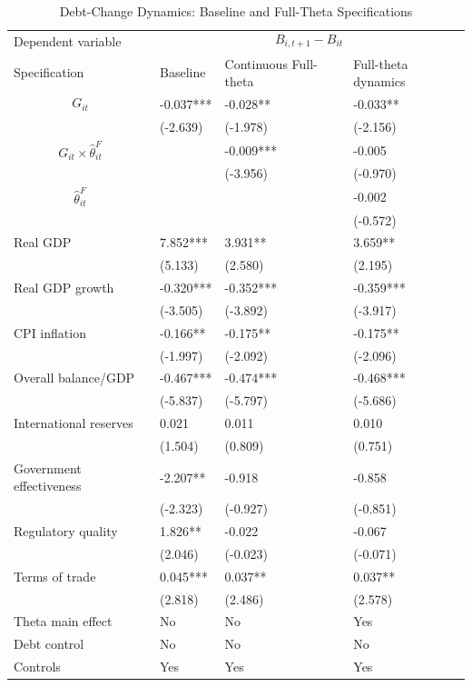 \begin{table}[H]\centering
\begin{threeparttable}
\caption{Debt-Change Dynamics: Baseline and Full-Theta Specifications}
\label{tab:debt_change_combined_fulltheta}
\scriptsize
\begin{tabularx}{\textwidth}{lYYY}
\toprule
Dependent variable &  \\
\cmidrule(lr){2-4}
Specification & Baseline & Continuous Full-theta & Full-theta dynamics \\
\midrule
$$G_{it}$$ & -0.037*** & -0.028** & -0.033** \\
 & (-2.639) & (-1.978) & (-2.156) \\
$$G_{it}\times\widehat{\theta}^{F}_{it}$$ &  & -0.009*** & -0.005 \\
 &  & (-3.956) & (-0.970) \\
$$\widehat{\theta}^{F}_{it}$$ &  &  & -0.002 \\
 &  &  & (-0.572) \\
Real GDP & 7.852*** & 3.931** & 3.659** \\
 & (5.133) & (2.580) & (2.195) \\
Real GDP growth & -0.320*** & -0.352*** & -0.359*** \\
 & (-3.505) & (-3.892) & (-3.917) \\
CPI inflation & -0.166** & -0.175** & -0.175** \\
 & (-1.997) & (-2.092) & (-2.096) \\
Overall balance/GDP & -0.467*** & -0.474*** & -0.468*** \\
 & (-5.837) & (-5.797) & (-5.686) \\
International reserves & 0.021 & 0.011 & 0.010 \\
 & (1.504) & (0.809) & (0.751) \\
Government effectiveness & -2.207** & -0.918 & -0.858 \\
 & (-2.323) & (-0.927) & (-0.851) \\
Regulatory quality & 1.826** & -0.022 & -0.067 \\
 & (2.046) & (-0.023) & (-0.071) \\
Terms of trade & 0.045*** & 0.037** & 0.037** \\
 & (2.818) & (2.486) & (2.578) \\
\midrule
Theta main effect & No & No & Yes \\
Debt control & No & No & No \\
Controls & Yes & Yes & Yes \\

\end{tabularx}
\end{threeparttable}
\end{table}
